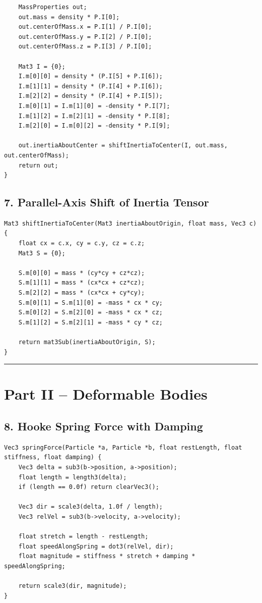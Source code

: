 \documentclass[10pt,letterpaper]{article}
\begin{document}
\begin{verbatim}
    MassProperties out;
    out.mass = density * P.I[0];
    out.centerOfMass.x = P.I[1] / P.I[0];
    out.centerOfMass.y = P.I[2] / P.I[0];
    out.centerOfMass.z = P.I[3] / P.I[0];

    Mat3 I = {0};
    I.m[0][0] = density * (P.I[5] + P.I[6]);
    I.m[1][1] = density * (P.I[4] + P.I[6]);
    I.m[2][2] = density * (P.I[4] + P.I[5]);
    I.m[0][1] = I.m[1][0] = -density * P.I[7];
    I.m[1][2] = I.m[2][1] = -density * P.I[8];
    I.m[2][0] = I.m[0][2] = -density * P.I[9];

    out.inertiaAboutCenter = shiftInertiaToCenter(I, out.mass, out.centerOfMass);
    return out;
}
\end{verbatim}

\subsection*{7. Parallel-Axis Shift of Inertia Tensor}

\begin{verbatim}
Mat3 shiftInertiaToCenter(Mat3 inertiaAboutOrigin, float mass, Vec3 c) {
    float cx = c.x, cy = c.y, cz = c.z;
    Mat3 S = {0};

    S.m[0][0] = mass * (cy*cy + cz*cz);
    S.m[1][1] = mass * (cx*cx + cz*cz);
    S.m[2][2] = mass * (cx*cx + cy*cy);
    S.m[0][1] = S.m[1][0] = -mass * cx * cy;
    S.m[0][2] = S.m[2][0] = -mass * cx * cz;
    S.m[1][2] = S.m[2][1] = -mass * cy * cz;

    return mat3Sub(inertiaAboutOrigin, S);
}
\end{verbatim}

\medskip\hrule\medskip

\clearpage
\section*{Part II -- Deformable Bodies}

\subsection*{8. Hooke Spring Force with Damping}

\begin{verbatim}
Vec3 springForce(Particle *a, Particle *b, float restLength, float stiffness, float damping) {
    Vec3 delta = sub3(b->position, a->position);
    float length = length3(delta);
    if (length == 0.0f) return clearVec3();

    Vec3 dir = scale3(delta, 1.0f / length);
    Vec3 relVel = sub3(b->velocity, a->velocity);

    float stretch = length - restLength;
    float speedAlongSpring = dot3(relVel, dir);
    float magnitude = stiffness * stretch + damping * speedAlongSpring;

    return scale3(dir, magnitude);
}
\end{verbatim}
\end{document}
